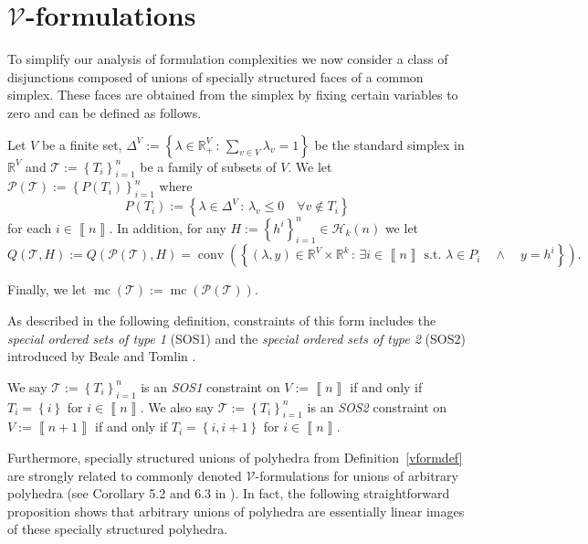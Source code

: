 \documentclass[mnsc]{informs3}
\newcommand{\set}[1]{\left\{#1\right\}}                     %
\newcommand{\bra}[1]{\left(#1\right)}
\newcommand{\sidx}[1]{\left\llbracket     #1 \right\rrbracket}
\newcommand{\Real}{\mathbb R}
\DeclareMathOperator{\mmc}{mc}
\DeclareMathOperator{\conv}{conv}
\begin{document}
\section{$\mathcal{V}$-formulations}\label{vsection}


To simplify our analysis of formulation complexities we now consider a class of disjunctions composed of unions of specially structured faces of a common simplex. These faces are obtained from the simplex by fixing certain variables to zero and can be defined as follows.

\begin{definition}\label{vformdef} Let $V$ be a finite set, $\Delta^V:=\set{\lambda\in \Real^V_+\,:\, \sum\nolimits_{v\in V} \lambda_v=1}$ be the standard simplex in $\mathbb{R}^V$ and  $\mathcal{T}:=\set{T_i}_{i=1}^n$ be a family of subsets of $V$. We let $\mathcal{P}\bra{\mathcal{T}}:=\set{P\bra{T_i}}_{i=1}^n$ where \[P\bra{T_i}:=\set{ \lambda\in \Delta^V\,:\, \lambda_v\leq 0\quad \forall v\notin T_i}\] for each $i\in\sidx{n}$. In addition, for any  $H:=\set{h^i}_{i=1}^n\in \mathcal{H}_k(n)$ we let
\[Q\bra{\mathcal{T},H}:=Q\bra{\mathcal{P}\bra{\mathcal{T}},H}=\conv\bra{\set{\bra{\lambda,y}\in \Real^V\times \Real^k\,:\, \exists i\in \sidx{n} \text{ s.t. }  \lambda\in P_i\quad\wedge\quad  y=h^i}}.\]

Finally, we let $\mmc\bra{\mathcal{T}}:=\mmc\bra{\mathcal{P}\bra{\mathcal{T}}}$.
\end{definition}

As described in the following definition, constraints of this form includes the \emph{special ordered sets of type 1} (SOS1) and the \emph{special ordered sets of type 2} (SOS2) introduced by Beale and Tomlin \cite{Beale70}.

\begin{definition} We say $\mathcal{T}:=\set{T_i}_{i=1}^n$ is an \emph{SOS1} constraint on $V:=\sidx{n}$ if and only if $T_i=\set{i}$ for $i\in \sidx{n}$. We also say $\mathcal{T}:=\set{T_i}_{i=1}^n$ is an \emph{SOS2} constraint on $V:=\sidx{n+1}$ if and only if $T_i=\set{i,i+1}$ for $i\in \sidx{n}$.
\end{definition}

Furthermore, specially structured unions of polyhedra from Definition~\ref{vformdef} are strongly related to commonly denoted $\mathcal{V}$-formulations for unions of arbitrary polyhedra (see Corollary 5.2 and 6.3 in \cite{Mixed-Integer-Linear-Programming-Formulation-Techniques}).
In fact, the following straightforward proposition shows that arbitrary unions of polyhedra are essentially linear images of these specially structured polyhedra.
\end{document}
